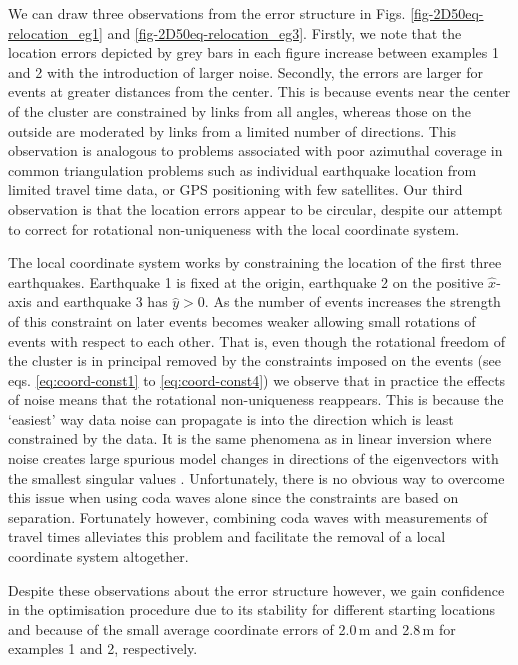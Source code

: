 \documentclass[extra]{gji}
\begin{document}
We can draw three observations from the error structure in Figs. \ref{fig-2D50eq-relocation_eg1} and
\ref{fig-2D50eq-relocation_eg3}. Firstly, we note that the location errors depicted
by grey bars in each figure increase between examples 1 and 2 with the
introduction of larger noise. Secondly, the errors are larger for
events at greater distances from the center. This is because events near the center of the cluster are
constrained by links from all angles, whereas those
on the outside are moderated by links from a limited number of directions. This observation is analogous
to problems associated with poor azimuthal coverage in common triangulation problems such as individual earthquake location
from limited travel time data, or GPS positioning with few satellites. Our third observation is that the location errors appear to
be circular, despite our attempt to correct for rotational non-uniqueness with the local coordinate system.

The local coordinate system works by constraining the location of the first three
earthquakes. Earthquake 1 is fixed at the origin, earthquake 2 on the positive $\hat{x}$-axis and earthquake 3
has $\hat{y}>0$. As the number of events increases the strength of this constraint on later events
becomes weaker allowing small rotations of events with respect to each other.
That is, even though the rotational freedom of the cluster is in principal
removed by the constraints imposed on the events (see eqs. \ref{eq:coord-const1} to \ref {eq:coord-const4}) we observe that
in practice the effects of noise means that the rotational non-uniqueness
reappears. This is because the `easiest' way data noise can propagate is into
the direction which is least constrained by the data. It is the same phenomena as in
linear inversion where noise creates large spurious model changes in directions
of the eigenvectors with the smallest singular values \citep[e.g ][]{dr_Aster05a}.
Unfortunately, there is no obvious way to overcome this issue when using coda
waves alone since the constraints are based on separation. Fortunately however, combining coda waves with
measurements of travel times alleviates this problem and facilitate the removal of a local coordinate system
altogether.

Despite these observations about the error structure however, we gain confidence in the
optimisation procedure due to its stability for different starting locations and
because of the small average coordinate errors of 2.0\,m and 2.8\,m
for examples 1 and 2, respectively.
\end{document}
